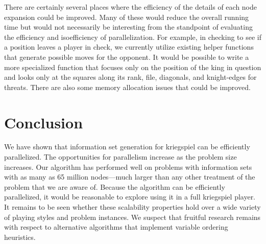 \documentclass[11pt]{article}
\begin{document}
There are certainly several places where the efficiency of the details of each node expansion could be improved.  Many
of these would reduce the overall running time but would not necessarily be interesting from the standpoint of
evaluating the efficiency and isoefficiency of parallelization.  For example, in checking to see if a position leaves a
player in check, we currently utilize existing helper functions that generate possible moves for the opponent.  It would
be possible to write a more specialized function that focuses only on the position of the king in question and looks
only at the squares along its rank, file, diagonals, and knight-edges for threats.  There are also some memory
allocation issues that could be improved. 

\section{Conclusion}
We have shown that information set generation for kriegspiel can be efficiently parallelized.  The opportunities for
parallelism increase as the problem size increases.  Our algorithm has performed well on problems with information sets
with as many as 65 million nodes---much larger than any other treatment of the problem that we are aware of.  Because
the algorithm can be efficiently parallelized, it would be reasonable to explore using it in a full kriegspiel player.
It remains to be seen whether these scalability properties hold over a wide variety of playing styles and problem
instances.  We suspect that fruitful research remains with respect to alternative algorithms that implement variable
ordering heuristics.
\end{document}
